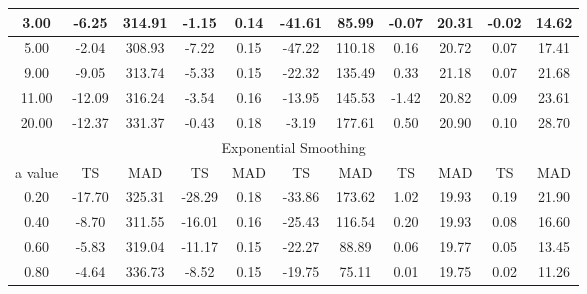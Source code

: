 \documentclass[conference,onecolumn]{IEEEtran}
\begin{document}
\begin{table}[ht]
\begin{tabular}{|c|c|c|c|c|c|c|c|c|c|c|}
3.00        & -6.25            & 314.91           & -1.15              & 0.14            & -41.61          & 85.99          & -0.07            & 20.31           & -0.02            & 14.62            \\ \hline
5.00        & -2.04            & 308.93           & -7.22              & 0.15            & -47.22          & 110.18         & 0.16             & 20.72           & 0.07             & 17.41            \\ \hline
9.00        & -9.05            & 313.74           & -5.33              & 0.15            & -22.32          & 135.49         & 0.33             & 21.18           & 0.07             & 21.68            \\ \hline
11.00       & -12.09           & 316.24           & -3.54              & 0.16            & -13.95          & 145.53         & -1.42            & 20.82           & 0.09             & 23.61            \\ \hline
20.00       & -12.37           & 331.37           & -0.43              & 0.18            & -3.19           & 177.61         & 0.50             & 20.90           & 0.10             & 28.70            \\ \hline
\multicolumn{11}{|c|}{Exponential Smoothing}                                                                                                                                                           \\ \hline
a value     & TS               & MAD              & TS                 & MAD             & TS              & MAD            & TS               & MAD             & TS               & MAD              \\ \hline
0.20        & -17.70           & 325.31           & -28.29             & 0.18            & -33.86          & 173.62         & 1.02             & 19.93           & 0.19             & 21.90            \\ \hline
0.40        & -8.70            & 311.55           & -16.01             & 0.16            & -25.43          & 116.54         & 0.20             & 19.93           & 0.08             & 16.60            \\ \hline
0.60        & -5.83            & 319.04           & -11.17             & 0.15            & -22.27          & 88.89          & 0.06             & 19.77           & 0.05             & 13.45            \\ \hline
0.80        & -4.64            & 336.73           & -8.52              & 0.15            & -19.75          & 75.11          & 0.01             & 19.75           & 0.02             & 11.26            \\ \hline

\end{tabular}
\end{table}
\end{document}
